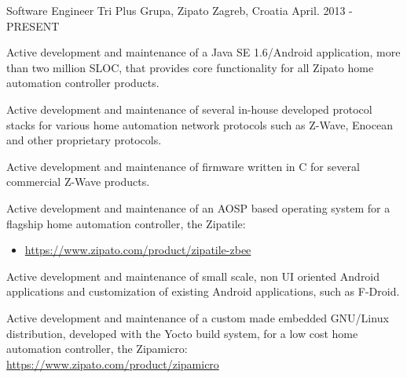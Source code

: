 \begin{cventries}
  \cventry
    {Software Engineer}
    {Tri Plus Grupa, Zipato}
    {Zagreb, Croatia}
    {April. 2013 - PRESENT}
    {
      \begin{cvitems}
        \bigbreak
        \item {Active development and maintenance of a Java SE 1.6/Android application, more than two million SLOC, that provides core functionality for all Zipato home automation controller products.}
        \bigbreak
        \item {Active development and maintenance of several in-house developed protocol stacks for various home automation network protocols such as Z-Wave, Enocean and other proprietary protocols.}
        \bigbreak
        \item {Active development and maintenance of firmware written in C for several commercial Z-Wave products.}
        \bigbreak
        \item{Active development and maintenance of an AOSP based operating system for a flagship home automation controller, the Zipatile:}
        \begin{itemize}
            \item \href{https://www.zipato.com/product/zipatile-zbee}{https://www.zipato.com/product/zipatile-zbee}
        \end{itemize}
        \bigbreak
        \item{Active development and maintenance of small scale, non UI oriented Android applications and customization of existing Android applications, such as F-Droid.}
        \bigbreak
        \item{Active development and maintenance of a custom made embedded GNU/Linux distribution, developed with the Yocto build system, for a low cost home automation controller, the Zipamicro: \href{https://www.zipato.com/product/zipamicro}{https://www.zipato.com/product/zipamicro}}
      \end{cvitems}
    }
\end{cventries}